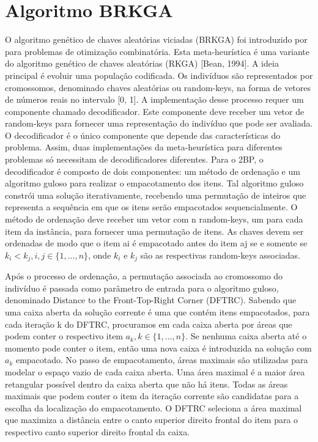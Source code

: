 \documentclass[article]{rian_article}
\begin{document}
\section{Algoritmo BRKGA}\label{sec:corte}
O algoritmo genético de chaves aleatórias viciadas (BRKGA) foi introduzido por \citet{resende2013} para problemas de otimização combinatória. Esta meta-heurística é uma variante do algoritmo genético de chaves aleatórias (RKGA) [Bean, 1994]. A ideia principal é evoluir uma população codificada. Os indivíduos são representados por cromossomos, denominado chaves aleatórias ou random-keys, na forma de vetores de números reais no intervalo [0, 1]. A implementação desse processo requer um componente chamado decodificador. Este componente deve receber um vetor de random-keys para fornecer uma representação do indivíduo que pode ser avaliada. O decodificador é o único componente que depende das características do problema. Assim, duas implementações da meta-heurística para diferentes problemas só necessitam de decodificadores diferentes. Para o 2BP, o decodificador é composto de dois componentes: um método de ordenação e um algoritmo guloso para realizar o empacotamento dos itens. Tal algoritmo guloso constrói uma solução iterativamente, recebendo uma permutação de inteiros que representa a sequência em que os itens serão empacotados sequencialmente. O método de ordenação deve receber um vetor com n random-keys, um para cada item da instância, para fornecer uma permutação de itens. As chaves devem ser ordenadas de modo que o item ai é empacotado antes do item aj se e somente se $k_{i} < k_{j}, {i}, {j} \in \{1, ..., {n}\}$, onde $k_{i}$ e $k_{j}$ são as respectivas random-keys associadas.

Após o processo de ordenação, a permutação associada ao cromossomo do indivíduo é passada como parâmetro de entrada para o algoritmo guloso, denominado Distance to the Front-Top-Right Corner (DFTRC). Sabendo que uma caixa aberta da solução corrente é uma que contém itens empacotados, para cada iteração k do DFTRC, procuramos em cada caixa aberta por áreas que podem conter o respectivo item $a_{k}, {k} \in \{1, ..., {n}\}$. Se nenhuma caixa aberta até o momento pode conter o item, então uma nova caixa é introduzida na solução com $a_{k}$ empacotado. No passo de empacotamento, áreas maximais são utilizadas para modelar o espaço vazio de cada caixa aberta. Uma área maximal é a maior área retangular possível dentro da caixa aberta que não há itens. Todas as áreas maximais que podem conter o item da iteração corrente são candidatas para a escolha da localização do empacotamento. O DFTRC seleciona a área maximal que maximiza a distância entre o canto superior direito frontal do item para o respectivo canto superior direito frontal da caixa.
\end{document}
